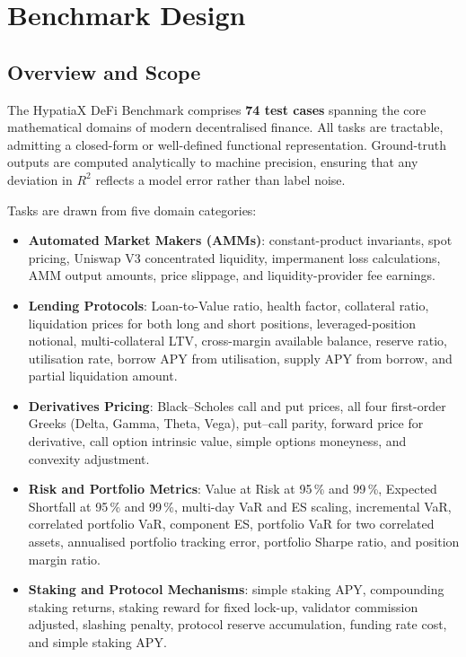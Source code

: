 \documentclass[twoside,11pt]{article}
\newcommand{\Rsq}{R^{2}}
\begin{document}
\section{Benchmark Design}
\label{sec:benchmark}

\subsection{Overview and Scope}\label{subsec:overview-and-scope}
\label{sec:bench_overview}

The HypatiaX DeFi Benchmark comprises \textbf{74 test cases} spanning the core
mathematical domains of modern decentralised finance.  All tasks are tractable,
admitting a closed-form or well-defined functional representation.  Ground-truth
outputs are computed analytically to machine precision, ensuring that any
deviation in $\Rsq$ reflects a model error rather than label noise.

Tasks are drawn from five domain categories:
\begin{itemize}
  \item \textbf{Automated Market Makers (AMMs)}: constant-product invariants,
    spot pricing, Uniswap V3 concentrated liquidity, impermanent loss calculations,
    AMM output amounts, price slippage, and liquidity-provider fee earnings.
  \item \textbf{Lending Protocols}: Loan-to-Value ratio, health factor, collateral ratio,
    liquidation prices for both long and short positions, leveraged-position notional,
    multi-collateral LTV, cross-margin available balance, reserve ratio, utilisation rate,
    borrow APY from utilisation, supply APY from borrow, and partial liquidation amount.
  \item \textbf{Derivatives Pricing}: Black--Scholes call and put prices,
    all four first-order Greeks (Delta, Gamma, Theta, Vega), put--call parity,
    forward price for derivative, call option intrinsic value, simple options
    moneyness, and convexity adjustment.
  \item \textbf{Risk and Portfolio Metrics}: Value at Risk at 95\,\% and 99\,\%,
    Expected Shortfall at 95\,\% and 99\,\%, multi-day VaR and ES scaling,
    incremental VaR, correlated portfolio VaR, component ES, portfolio VaR for
    two correlated assets, annualised portfolio tracking error, portfolio Sharpe
    ratio, and position margin ratio.
  \item \textbf{Staking and Protocol Mechanisms}: simple staking APY, compounding
    staking returns, staking reward for fixed lock-up, validator commission adjusted,
    slashing penalty, protocol reserve accumulation, funding rate cost, and simple
    staking APY.
\end{itemize}
\end{document}

